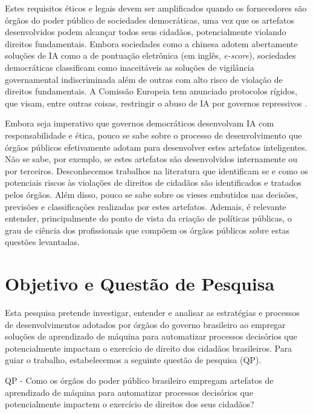 \documentclass[12pt]{article}
\begin{document}
Estes requisitos éticos e legais devem ser amplificados quando os fornecedores são órgãos do poder público de sociedades democráticas, uma vez que os artefatos desenvolvidos podem alcançar todos seus cidadãos, potencialmente violando direitos fundamentais. Embora sociedades como a chinesa adotem abertamente soluções de IA como a de pontuação eletrônica (em inglês, \textit{e-score}), sociedades democráticas classificam como inaceitáveis as soluções de vigilância governamental indiscriminada além de outras com alto risco de violação de direitos fundamentais. A Comissão Europeia tem anunciado protocolos rígidos, que visam, entre outras coisas, restringir o abuso de IA por governos repressivos \cite{EC2020}.

Embora seja imperativo que governos democráticos desenvolvam IA com responsabilidade e ética, pouco se sabe sobre o processo de desenvolvimento que órgãos públicos efetivamente adotam para desenvolver estes artefatos inteligentes. Não se sabe, por exemplo, se estes artefatos são desenvolvidos internamente ou por terceiros. Desconhecemos trabalhos na literatura que identificam se e como os potenciais riscos às violações de direitos de cidadãos são identificados e tratados pelos órgãos. Além disso, pouco se sabe sobre os vieses embutidos nas decisões, previsões e classificações realizadas por estes artefatos. Ademais, é relevante entender, principalmente do ponto de vista da criação de políticas públicas, o grau de ciência dos profissionais que compõem os órgãos públicos sobre estas questões levantadas.





\section{Objetivo e Questão de Pesquisa}

Esta pesquisa pretende investigar, entender e analisar as estratégias e processos de desenvolvimentos adotados por órgãos do governo brasileiro ao empregar soluções de aprendizado de máquina para automatizar processos decisórios que potencialmente impactam o exercício de direito dos cidadãos brasileiros. Para guiar o trabalho, estabelecemos a seguinte questão de pesquisa (QP).

\vspace{6pt}
\noindent
QP - Como os órgãos do poder público brasileiro empregam artefatos de aprendizado de máquina para automatizar processos decisórios que potencialmente impactem o exercício de direitos dos seus cidadãos?
\end{document}
